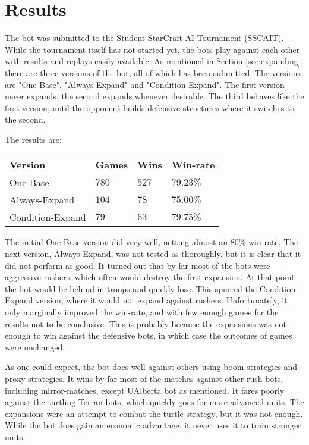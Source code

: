\chapter{Results}
\label{ch:results}
The bot was submitted to the Student StarCraft AI Tournament (SSCAIT). While the tournament itself has not started yet, the bots play against each other with results and replays easily available. As mentioned in Section \ref{sec:expanding} there are three versions of the bot, all of which has been submitted. The versions are "One-Base", "Always-Expand" and "Condition-Expand". The first version never expands, the second expands whenever desirable. The third behaves like the first version, until the opponent builds defensive structures where it switches to the second.

The results are:

	\begin{center}
	\begin{tabularx}{\linewidth}{|X||l|l|l|}
		\hline
		Version				& Games	& Wins	& Win-rate	\\
		\hline
		One-Base			& $780$	& $527$	& $79.23\%$	\\
		Always-Expand		& $104$	& $78$	& $75.00\%$	\\
		Condition-Expand	& $79$	& $63$	& $79.75\%$	\\
		\hline
	\end{tabularx}
	\end{center}

The initial One-Base version did very well, netting almost an $80\%$ win-rate. The next version, Always-Expand, was not tested as thoroughly, but it is clear that it did not perform as good. It turned out that by far most of the bots were aggressive rushers, which often would destroy the first expansion. At that point the bot would be behind in troops and quickly lose. This spurred the Condition-Expand version, where it would not expand against rushers. Unfortunately, it only marginally improved the win-rate, and with few enough games for the results not to be conclusive. This is probably because the expansions was not enough to win against the defensive bots, in which case the outcomes of games were unchanged.

As one could expect, the bot does well against others using boom-strategies and proxy-strategies. It wins by far most of the matches against other rush bots, including mirror-matches, except UAlberta bot as mentioned. It fares poorly against the turtling Terran bots, which quickly goes for more advanced units. The expansions were an attempt to combat the turtle strategy, but it was not enough. While the bot does gain an economic advantage, it never uses it to train stronger units.

